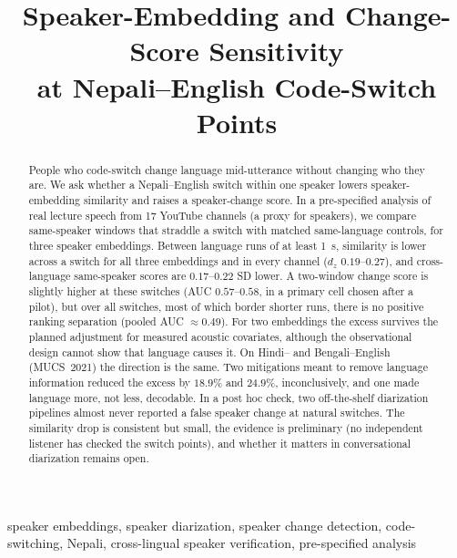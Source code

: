 \documentclass[conference]{IEEEtran}
\begin{document}
\title{Speaker-Embedding and Change-Score Sensitivity\\
at Nepali--English Code-Switch Points}

\author{%
}

\maketitle

\begin{abstract}
People who code-switch change language mid-utterance without changing who they are. We ask
whether a Nepali--English switch within one speaker lowers speaker-embedding similarity and
raises a speaker-change score. In a pre-specified analysis of real lecture speech from 17
YouTube channels (a proxy for speakers), we compare same-speaker windows that straddle a
switch with matched same-language controls, for three speaker embeddings. Between language
runs of at least 1~s, similarity is lower across a switch for all three embeddings and in
every channel ($d_z$ $0.19$--$0.27$), and cross-language same-speaker scores are
$0.17$--$0.22$ SD lower. A two-window change score is slightly higher at these switches (AUC
$0.57$--$0.58$, in a primary cell chosen after a pilot), but over all switches, most of which border shorter runs, there is no positive ranking separation (pooled AUC $\approx 0.49$). For two embeddings the excess survives the planned adjustment for measured acoustic covariates, although the observational
design cannot show that language causes it. On Hindi-- and Bengali--English (MUCS~2021) the
direction is the same. Two mitigations meant to remove language information reduced the excess by $18.9\%$ and $24.9\%$, inconclusively, and one made language more, not less, decodable. In a post hoc check, two off-the-shelf diarization
pipelines almost never reported a false speaker change at natural switches. The similarity drop is consistent but small, the evidence is preliminary (no independent listener has checked the switch points), and whether it matters in conversational diarization remains open.
\end{abstract}

\begin{IEEEkeywords}
speaker embeddings, speaker diarization, speaker change detection, code-switching, Nepali,
cross-lingual speaker verification, pre-specified analysis
\end{IEEEkeywords}
\end{document}
